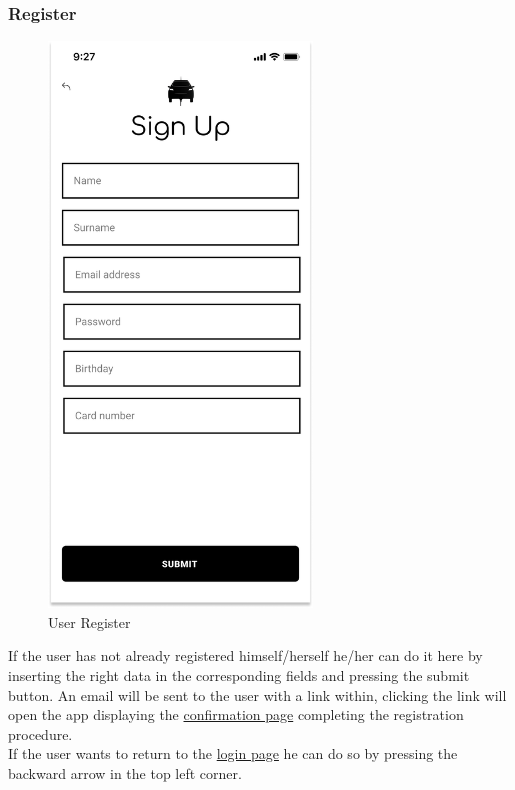 \subsubsection{Register}
\begin{figure}[H]
    \centering
    \includegraphics[keepaspectratio, height=15cm]{Mockup/UserAppInterface/Register.png}
    \caption{User Register}
    \label{fig:Register}
\end{figure}
If the user has not already registered himself/herself he/her can do it here by inserting the right data in the corresponding fields and pressing the submit button.
An email will be sent to the user with a link within, clicking the link will open the app displaying the \hyperref[fig:ConfirmReg]{confirmation page} completing the registration procedure.\\
If the user wants to return to the \hyperref[fig:Login]{login page} he can do so by pressing the backward arrow in the top left corner.
